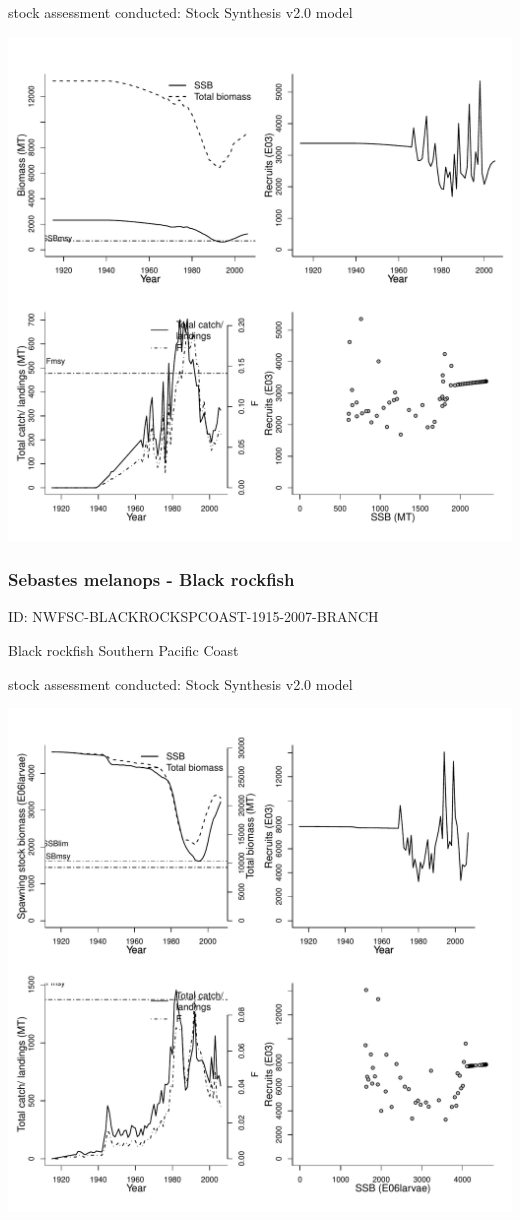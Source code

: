 stock assessment conducted: Stock Synthesis v2.0 model 
\begin{center}
\vspace{-0.2cm}\includegraphics[scale=0.65]{../tex/figures/plot-NWFSC-BLACKROCKNPCOAST-1914-2006-BRANCH.pdf}
\end{center}

\newpage
\subsubsection{Sebastes melanops - Black rockfish}
ID: NWFSC-BLACKROCKSPCOAST-1915-2007-BRANCH

Black rockfish Southern Pacific Coast 

stock assessment conducted: Stock Synthesis v2.0 model 
\begin{center}
\vspace{-0.2cm}\includegraphics[scale=0.65]{../tex/figures/plot-NWFSC-BLACKROCKSPCOAST-1915-2007-BRANCH.pdf}
\end{center}

\newpage
